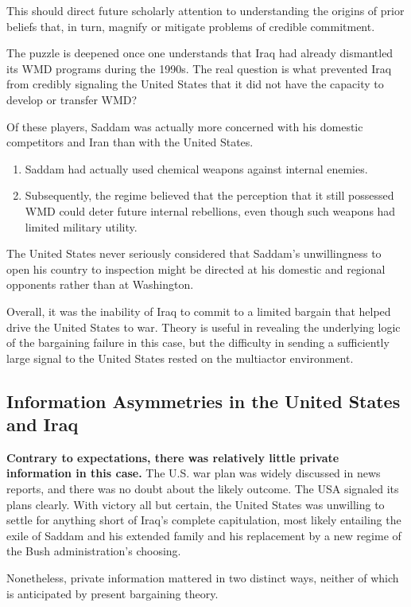 This should direct future scholarly attention to understanding the origins of prior beliefs that, in turn, magnify or mitigate problems of credible commitment.

The puzzle is deepened once one understands that Iraq had already dismantled its WMD programs during the 1990s. The real question is what prevented Iraq from credibly signaling the United States that it did not have the capacity to develop or transfer WMD?

Of these players, Saddam was actually more concerned with his domestic competitors and Iran than with the United States.
\begin{enumerate}
    \item Saddam had actually used chemical weapons against internal enemies.
    \item Subsequently, the regime believed that the perception that it still possessed WMD could deter future internal rebellions, even though such weapons had limited military utility.
\end{enumerate}

The United States never seriously considered that Saddam's unwillingness to open his country to inspection might be directed at his domestic and regional opponents rather than at Washington.

Overall, it was the inability of Iraq to commit to a limited bargain that helped drive the United States to war. Theory is useful in revealing the underlying logic of the bargaining failure in this case, but the difficulty in sending a sufficiently large signal to the United States rested on the multiactor environment.

\subsection{Information Asymmetries in the United States and Iraq}
\textbf{Contrary to expectations, there was relatively little private information in this case.}
The U.S. war plan was widely discussed in news reports, and there was no doubt about the likely outcome. The USA signaled its plans clearly. With victory all but certain, the United States was unwilling to settle for anything short of Iraq's complete capitulation, most likely entailing the exile of Saddam and his extended family and his replacement by a new regime of the Bush administration's choosing.

Nonetheless, private information mattered in two distinct ways, neither of which is anticipated by present bargaining theory.

